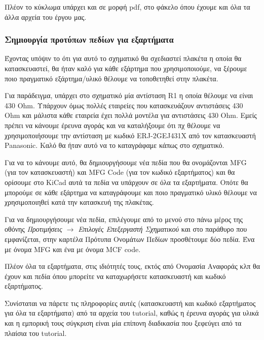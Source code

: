 \documentclass[a4paper]{article}
\begin{document}
Πλέον το κύκλωμα υπάρχει και σε μορφή pdf, στο φάκελο όπου έχουμε και όλα τα άλλα αρχεία του έργου μας. 


\subsubsection{Σημιουργία προτύπων πεδίων για εξαρτήματα}
Έχοντας υπόψιν το ότι για αυτό το σχηματικό θα σχεδιαστεί πλακέτα η οποία θα κατασκευαστεί, θα ήταν καλό για κάθε εξάρτημα που χρησιμοποιούμε, να ξέρουμε ποιο πραγματικό εξάρτημα/υλικό θέλουμε να τοποθετηθεί στην πλακέτα. 

Για παράδειγμα, υπάρχει στο σχηματικό μία αντίσταση R1 η οποία θέλουμε να είναι 430 Ohm. Υπάρχουν όμως πολλές εταιρείες που κατασκευάζουν αντιστάσεις 430 Ohm και μάλιστα κάθε εταιρεία έχει πολλά μοντέλα για αντιστάσεις 430 Ohm. Εμείς πρέπει να κάνουμε έρευνα αγοράς και να καταλήξουμε ότι πχ θέλουμε να χρησιμοποιήσουμε την αντίσταση με κωδικό ERJ-2GEJ431X από τον κατασκευαστή Panasonic. Καλό θα ήταν αυτό να το καταγράφαμε κάπως στο σχηματικό. 

Για να το κάνουμε αυτό, θα δημιουργήσουμε νέα πεδία που θα ονομάζονται MFG (για τον κατασκευαστή) και MFG Code (για τον κωδικό εξαρτήματος) και θα ορίσουμε στο KiCad αυτά τα πεδία να υπάρχουν σε όλα τα εξαρτήματα. Οπότε θα μπορούμε σε κάθε εξάρτημα να καταγράφουμε και ποιο πραγματικό υλικό θέλουμε να χρησιμοποιηθεί κατά την κατασκευή της πλακέτας.

Για να δημιουργήσουμε νέα πεδία, επιλέγουμε από το μενού στο πάνω μέρος της οθόνης \textit{Προτιμήσεις $\rightarrow$ Επιλογές Επεξεργαστή Σχηματικού} και στο παράθυρο που εμφανίζεται, στην καρτέλα Πρότυπα Ονομάτων Πεδίων προσθέτουμε δύο πεδία. Ένα με όνομα MFG και ένα με όνομα MCF code.

Πλέον όλα τα εξαρτήματα, στις ιδιότητές τους, εκτός από Ονομασία Αναφοράς κλπ θα έχουν και πεδία όπου μπορείτε να καταχωρήσετε κατασκευαστή και κωδικό εξαρτήματος. 

Συνίσταται να πάρετε τις πληροφορίες αυτές (κατασκευαστή και κωδικό εξαρτήματος για όλα τα εξαρτήματα) από τα αρχεία του tutorial, καθώς η έρευνα αγοράς για υλικά και η εμπορική τους σύγκριση είναι μία επίπονη διαδικασία που ξεφεύγει από τα πλαίσια του tutorial. 
\end{document}
